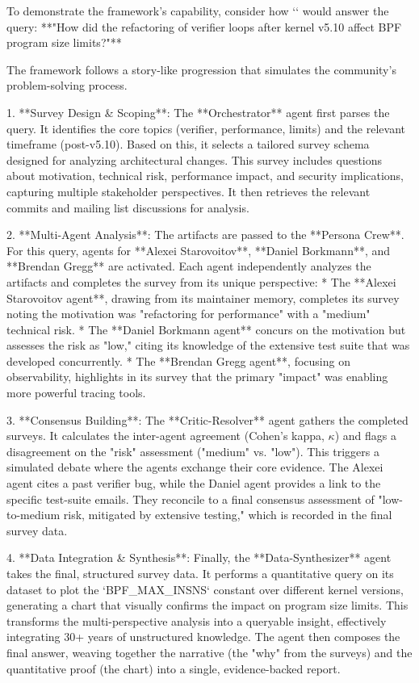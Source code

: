 To demonstrate the framework's capability, consider how `\sys` would answer the query: **"How did the refactoring of verifier loops after kernel v5.10 affect BPF program size limits?"**

The framework follows a story-like progression that simulates the community's problem-solving process.

1.  **Survey Design & Scoping**: The **Orchestrator** agent first parses the query. It identifies the core topics (verifier, performance, limits) and the relevant timeframe (post-v5.10). Based on this, it selects a tailored survey schema designed for analyzing architectural changes. This survey includes questions about motivation, technical risk, performance impact, and security implications, capturing multiple stakeholder perspectives. It then retrieves the relevant commits and mailing list discussions for analysis.

2.  **Multi-Agent Analysis**: The artifacts are passed to the **Persona Crew**. For this query, agents for **Alexei Starovoitov**, **Daniel Borkmann**, and **Brendan Gregg** are activated. Each agent independently analyzes the artifacts and completes the survey from its unique perspective:
    * The **Alexei Starovoitov agent**, drawing from its maintainer memory, completes its survey noting the motivation was "refactoring for performance" with a "medium" technical risk.
    * The **Daniel Borkmann agent** concurs on the motivation but assesses the risk as "low," citing its knowledge of the extensive test suite that was developed concurrently.
    * The **Brendan Gregg agent**, focusing on observability, highlights in its survey that the primary "impact" was enabling more powerful tracing tools.

3.  **Consensus Building**: The **Critic-Resolver** agent gathers the completed surveys. It calculates the inter-agent agreement (Cohen's kappa, $κ$) and flags a disagreement on the "risk" assessment ("medium" vs. "low"). This triggers a simulated debate where the agents exchange their core evidence. The Alexei agent cites a past verifier bug, while the Daniel agent provides a link to the specific test-suite emails. They reconcile to a final consensus assessment of "low-to-medium risk, mitigated by extensive testing," which is recorded in the final survey data.

4.  **Data Integration & Synthesis**: Finally, the **Data-Synthesizer** agent takes the final, structured survey data. It performs a quantitative query on its dataset to plot the `BPF_MAX_INSNS` constant over different kernel versions, generating a chart that visually confirms the impact on program size limits. This transforms the multi-perspective analysis into a queryable insight, effectively integrating 30+ years of unstructured knowledge. The agent then composes the final answer, weaving together the narrative (the "why" from the surveys) and the quantitative proof (the chart) into a single, evidence-backed report.
